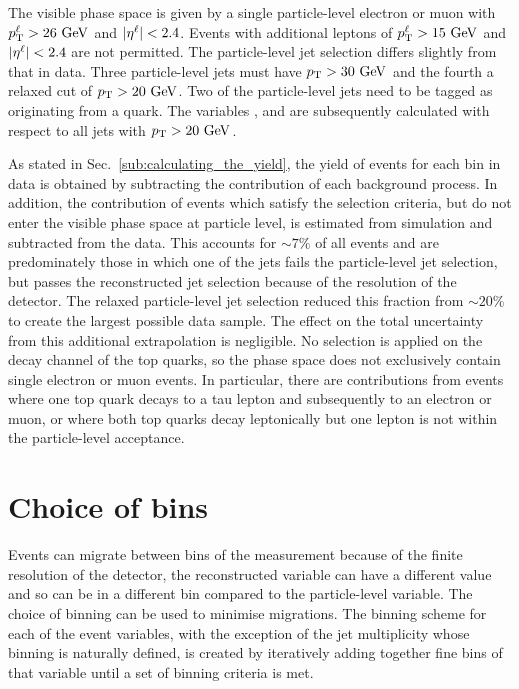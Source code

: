 The visible phase space is given by a single particle-level electron or muon with $p_{\mathrm{T}}^{\ell}>26\mathrm{~Ge\hspace{-.08em}V}^{}$ and $\lvert \eta^{\ell} \rvert<2.4$.
Events with additional leptons of $p_{\mathrm{T}}^{\ell}>15\mathrm{~Ge\hspace{-.08em}V}^{}$ and $\lvert \eta^{\ell} \rvert<2.4$ are not permitted.
The particle-level jet selection differs slightly from that in data.
Three particle-level jets must have $p_{\mathrm{T}}>30\mathrm{~Ge\hspace{-.08em}V}^{}$ and the fourth a relaxed cut of $p_{\mathrm{T}}>20\mathrm{~Ge\hspace{-.08em}V}^{}$.
Two of the particle-level jets need to be tagged as originating from a \bquark{} quark.
The variables \HT{}, \ST{} and \NJET{} are subsequently calculated with respect to all jets with $p_{\mathrm{T}}>20\mathrm{~Ge\hspace{-.08em}V}^{}$. 

As stated in Sec.~\ref{sub:calculating_the_yield}, the yield of \ttbar{} events for each bin in data is obtained by subtracting the contribution of each background process. In addition, the contribution of \ttbar events which satisfy the selection criteria, but do not enter the visible phase space at particle level, is estimated from simulation and subtracted from the data. 
This accounts for $\sim7\%$ of all \ttbar{} events and are predominately those
in which one of the jets fails the particle-level jet selection, but passes the reconstructed jet selection because of the resolution of the detector. 
The relaxed particle-level jet selection reduced this fraction from $\sim20\%$ to create the largest possible data sample.
The effect on the total uncertainty from this additional extrapolation is negligible.
No selection is applied on the decay channel of the top quarks, so the phase space does not exclusively contain single electron or muon \ttbar{} events. 
In particular, there are contributions from events where one top quark decays to a tau lepton and subsequently to an electron or muon, or where both top quarks decay leptonically but one lepton is not within the particle-level acceptance.

\section{Choice of bins} %
\label{sec:choice_of_bins}

Events can migrate between bins of the measurement because of the finite resolution of the \CMS{} detector, \ie{} the reconstructed variable can have a different value and so can be in a different bin compared to the particle-level variable.  
The choice of binning can be used to minimise migrations.
The binning scheme for each of the event variables, with the exception of the jet multiplicity whose binning is naturally defined, is created by iteratively adding together fine bins of that variable until a set of binning criteria is met.

